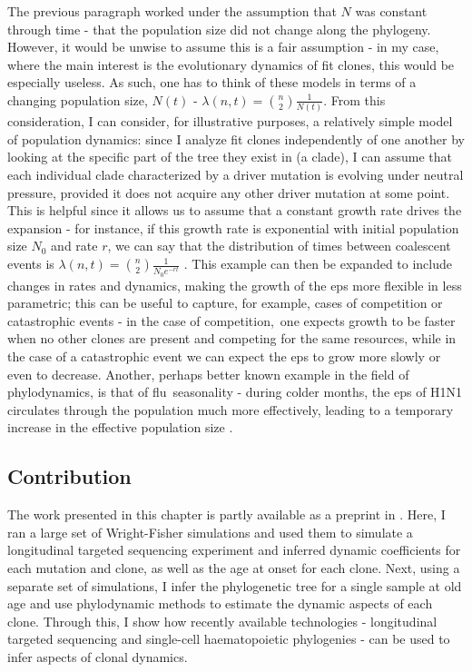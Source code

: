 The previous paragraph worked under the assumption that $N$ was constant through time - that the population size did not change along the phylogeny. However, it would be unwise to assume this is a fair assumption - in my case, where the main interest is the evolutionary dynamics of fit clones, this would be especially useless. As such, one has to think of these models in terms of a changing population size, $N(t)$ - $\lambda(n,t) = \binom{n}{2}\frac{1}{N(t)}$. From this consideration, I can consider, for illustrative purposes, a relatively simple model of population dynamics: since I analyze fit clones independently of one another by looking at the specific part of the tree they exist in (a clade), I can assume that each individual clade characterized by a driver mutation is evolving under neutral pressure, provided it does not acquire any other driver mutation at some point. This is helpful since it allows us to assume that a constant growth rate drives the expansion - for instance, if this growth rate is exponential with initial population size $N_0$ and rate $r$, we can say that the distribution of times between coalescent events is $\lambda(n,t) = \binom{n}{2}\frac{1}{N_0 e^{-rt}}$ \cite{Volz2013-ey}. This example can then be expanded to include changes in rates and dynamics, making the growth of the \ac{eps} more flexible in less parametric; this can be useful to capture, for example, cases of competition or catastrophic events - in the case of competition, one expects growth to be faster when no other clones are present and competing for the same resources, while in the case of a catastrophic event we can expect the \ac{eps} to grow more slowly or even to decrease. Another, perhaps better known example in the field of phylodynamics, is that of flu seasonality - during colder months, the \ac{eps} of H1N1 circulates through the population much more effectively, leading to a temporary increase in the effective population size \cite{Karcher2020-bg}. 

\subsection{Contribution}

The work presented in this chapter is partly available as a preprint in \cite{Fabre2021-uw}. Here, I ran a large set of Wright-Fisher simulations and used them to simulate a longitudinal targeted sequencing experiment and inferred dynamic coefficients for each mutation and clone, as well as the age at onset for each clone. Next, using a separate set of simulations, I infer the phylogenetic tree for a single sample at old age and use phylodynamic methods to estimate the dynamic aspects of each clone. Through this, I show how recently available technologies - longitudinal targeted sequencing and single-cell haematopoietic phylogenies - can be used to infer aspects of clonal dynamics.

